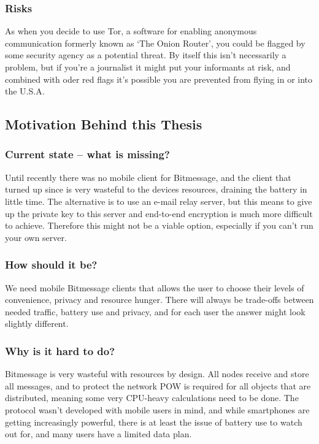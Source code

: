 \documentclass{bfh}
\begin{document}
  \subsubsection{Risks}
  As when you decide to use Tor, a software for enabling anonymous communication formerly known as `The Onion Router', you could be flagged by some security agency as a potential threat.\cite{wired:tor} By itself this isn't necessarily a problem, but if you're a journalist it might put your informants at risk, and combined with oder red flags it's possible you are prevented from flying in or into the U.S.A.


  \subsection{Motivation Behind this Thesis}
  \subsubsection{Current state -- what is missing?}
  Until recently there was no mobile client for Bitmessage, and the client that turned up since is very wasteful to the devices resources, draining the battery in little time. The alternative is to use an e-mail relay server, but this means to give up the private key to this server and end-to-end encryption is much more difficult to achieve. Therefore this might not be a viable option, especially if you can't run your own server.

  \subsubsection{How should it be?}
  We need mobile Bitmessage clients that allows the user to choose their levels of convenience, privacy and resource hunger. There will always be trade-offs between needed traffic, battery use and privacy, and for each user the answer might look slightly different.

  \subsubsection{Why is it hard to do?}
  Bitmessage is very wasteful with resources by design. All nodes receive and store all messages, and to protect the network \ac{POW} is required for all objects that are distributed, meaning some very \acs{CPU}-heavy calculations need to be done. The protocol wasn't developed with mobile users in mind, and while smartphones are getting increasingly powerful, there is at least the issue of battery use to watch out for, and many users have a limited data plan.
\end{document}

